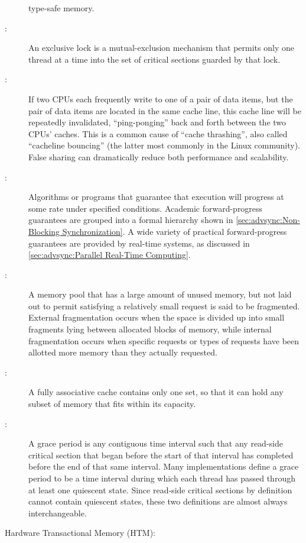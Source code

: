 \begin{description}
	type-safe memory.
\item[\IXGh{Exclusive}{Lock}:]
	An exclusive lock is a mutual-exclusion mechanism that
	permits only one thread at a time into the
	set of critical sections guarded by that lock.
\item[\IXG{False Sharing}:]
	If two CPUs each frequently write to one of a pair of data items,
	but the pair of data items are located in the same cache line,
	this cache line will be repeatedly invalidated, ``ping-ponging''
	back and forth between the two CPUs' caches.
	This is a common cause of ``cache thrashing'', also called
	``cacheline bouncing'' (the latter most commonly in the Linux
	community).
	False sharing can dramatically reduce both performance and
	scalability.
\item[\IXG{Forward-Progress Guarantee}:]
	Algorithms or programs that guarantee that execution will
	progress at some rate under specified conditions.
	Academic forward-progress guarantees are grouped into a
	formal hierarchy shown in
	\cref{sec:advsync:Non-Blocking Synchronization}.
	A wide variety of practical forward-progress guarantees are
	provided by real-time systems, as discussed in
	\cref{sec:advsync:Parallel Real-Time Computing}.
\item[\IXG{Fragmentation}:]
	A memory pool that has a large amount of unused memory, but
	not laid out to permit satisfying a relatively small request
	is said to be fragmented.
	External fragmentation occurs when the space is divided up
	into small fragments lying between allocated blocks of memory,
	while internal fragmentation occurs when specific requests or
	types of requests have been allotted more memory than they
	actually requested.
\item[\IXGh{Fully Associative}{Cache}:]
	A fully associative cache contains only
	one set, so that it can hold any subset of
	memory that fits within its capacity.
\item[\IXG{Grace Period}:]
	A grace period is any contiguous time interval such that
	any  read-side critical section that began before the
	start of that interval has
	completed before the end of that same interval.
	Many  implementations define a grace period to be a
	time interval during which each thread has passed through at
	least one quiescent state.
	Since  read-side critical sections by definition cannot
	contain quiescent states, these two definitions are almost
	always interchangeable.
\item[Hardware Transactional Memory (HTM):]

\end{description}
